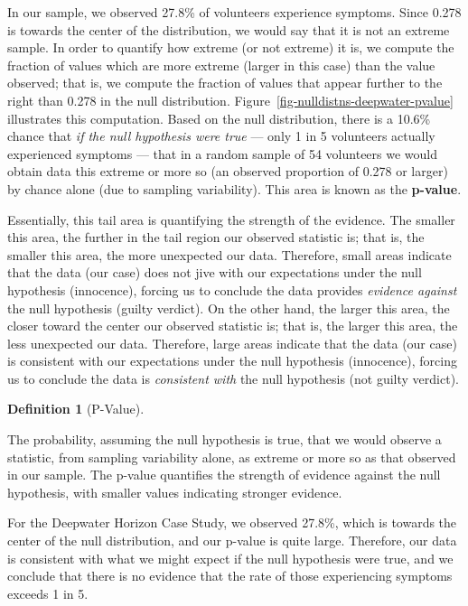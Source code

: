 \documentclass[
  letterpaper,
  DIV=11,
  numbers=noendperiod]{scrreprt}
\theoremstyle{definition}
\newtheorem{definition}{Definition}[chapter]
\theoremstyle{definition}
\theoremstyle{plain}
\theoremstyle{remark}
\begin{document}
In our sample, we observed 27.8\% of volunteers experience symptoms.
Since 0.278 is towards the center of the distribution, we would say that
it is not an extreme sample. In order to quantify how extreme (or not
extreme) it is, we compute the fraction of values which are more extreme
(larger in this case) than the value observed; that is, we compute the
fraction of values that appear further to the right than 0.278 in the
null distribution. Figure~\ref{fig-nulldistns-deepwater-pvalue}
illustrates this computation. Based on the null distribution, there is a
10.6\% chance that \emph{if the null hypothesis were true} --- only 1 in
5 volunteers actually experienced symptoms --- that in a random sample
of 54 volunteers we would obtain data this extreme or more so (an
observed proportion of 0.278 or larger) by chance alone (due to sampling
variability). This area is known as the \textbf{p-value}.

Essentially, this tail area is quantifying the strength of the evidence.
The smaller this area, the further in the tail region our observed
statistic is; that is, the smaller this area, the more unexpected our
data. Therefore, small areas indicate that the data (our case) does not
jive with our expectations under the null hypothesis (innocence),
forcing us to conclude the data provides \emph{evidence against} the
null hypothesis (guilty verdict). On the other hand, the larger this
area, the closer toward the center our observed statistic is; that is,
the larger this area, the less unexpected our data. Therefore, large
areas indicate that the data (our case) is consistent with our
expectations under the null hypothesis (innocence), forcing us to
conclude the data is \emph{consistent with} the null hypothesis (not
guilty verdict).

\begin{definition}[P-Value]\protect\hypertarget{def-pvalue}{}\label{def-pvalue}

The probability, assuming the null hypothesis is true, that we would
observe a statistic, from sampling variability alone, as extreme or more
so as that observed in our sample. The p-value quantifies the strength
of evidence against the null hypothesis, with smaller values indicating
stronger evidence.

\end{definition}

For the Deepwater Horizon Case Study, we observed 27.8\%, which is
towards the center of the null distribution, and our p-value is quite
large. Therefore, our data is consistent with what we might expect if
the null hypothesis were true, and we conclude that there is no evidence
that the rate of those experiencing symptoms exceeds 1 in 5.
\end{document}
